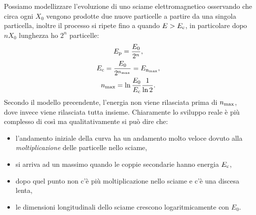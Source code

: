 Possiamo modellizzare l'evoluzione di uno sciame elettromagnetico osservando che circa ogni $X_0$ vengono prodotte due nuove particelle a partire da una singola particella, inoltre il processo si ripete fino a quando $E > E_\textup{c}$, in particolare dopo $nX_0$ lunghezza ho $2^n$ particelle:
\begin{gather*}
    E_\textup{p}   = \frac{E_0}{2^n},\\
    E_\textup{c}   = \frac{E_0}{2^{n_\textup{max}}} = E_{\textup{n}_\textup{max}},\\
    n_\textup{max} = \ln \frac{E_0}{E_\textup{c}} \frac{1}{\ln 2}.
\end{gather*}
Secondo il modello precendente, l'energia non viene rilasciata prima di $n_\textup{max}$, dove invece viene rilasciata tutta insieme. Chiaramente lo sviluppo reale è più complesso di così ma qualitativamente si può dire che:
\begin{itemize}
    \item l'andamento iniziale della curva ha un andamento molto veloce dovuto alla \emph{moltiplicazione} delle particelle nello sciame,
    \item si arriva ad un massimo quando le coppie secondarie hanno energia $E_\textup{c}$,
    \item dopo quel punto non c'è più moltiplicazione nello sciame e c'è una discesa lenta,
    \item le dimensioni longitudinali dello sciame crescono logaritmicamente con $E_0$.
\end{itemize}

